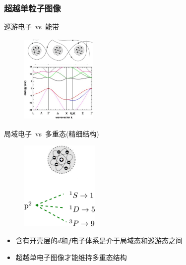 {\frame
{
	\frametitle{超越单粒子图像}
\begin{minipage}[b]{0.49\linewidth}
	巡游电子~\textrm{vs}~能带 
\begin{figure}[h!]
\centering
\vspace{-5pt}
\includegraphics[height=1.7in,width=1.45in,viewport=0 0 860 950,clip]{Figures/Itinerant_electrons-bands.png}
\label{Itinerant-band}
\end{figure}
{\fontsize{7.2pt}{6.2pt}}
\end{minipage}
\hfill
\begin{minipage}[b]{0.49\linewidth}
	局域电子~\textrm{vs}~多重态(精细结构)
\begin{figure}[h!]
\centering
\vspace{-5pt}
\includegraphics[height=1.7in,width=1.50in,viewport=0 0 700 770,clip]{Figures/Localized_electrons-multiplets.png}
\label{Localized-multiplets}
\end{figure}
{\fontsize{7.2pt}{6.2pt}}
\end{minipage}
\begin{itemize}
\vspace{-12pt}
	\item 含有开壳层的$d$和$f$电子体系是介于局域态和巡游态之间
	\item 超越单电子图像才能维持多重态结构
\end{itemize}
}

}
